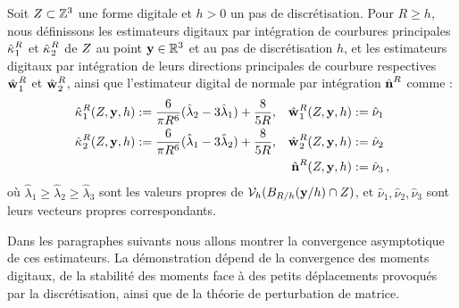 \begin{definition}
  \label{def:principal-curv-estimators}
%
  Soit $Z \subset \mathbb{Z}^3$ une forme digitale et $h > 0$ un pas de
  discrétisation. Pour $R \ge h$, nous définissons les estimateurs digitaux par
  intégration de courbures principales $\hat{\kappa_{}}_{1}^{R}$ et
  $\hat{\kappa_{}}_{2}^{R}$ de $Z$ au point $\mathbf{y} \in \mathbb{R}^3$ et au pas de
  discrétisation $h$, et les estimateurs digitaux par intégration de leurs
  directions principales de courbure respectives $\hat{\mathbf{w}_{}}_{1}^{R}$ et
  $\hat{\mathbf{w}_{}}_{2}^{R}$, ainsi que l'estimateur digital de normale par intégration
  $\hat{\mathbf{n}{}}^{R}$ comme :
%
\begin{align}
  \hat{\kappa_{}}_{1}^{R}(Z,\mathbf{y},h)  &:= \frac{6}{\pi R^6}(\hat{\lambda}_2 - 3\hat{\lambda}_1) + \frac{8}{5R},
  &\hat{\mathbf{w}_{}}_{1}^{R}(Z,\mathbf{y},h) &:= \hat{\nu}_1 \\
  \hat{\kappa_{}}_{2}^{R}(Z,\mathbf{y},h) &:= \frac{6}{\pi R^6}(\hat{\lambda}_1 - 3\hat{\lambda}_2) + \frac{8}{5R},
  &\hat{\mathbf{w}_{}}_{2}^{R}(Z,\mathbf{y},h) &:= \hat{\nu}_2\\
  & &\hat{\mathbf{n}{}}^{R}(Z,\mathbf{y},h) &:=\hat{\nu}_3\,,
\end{align}
%
où $\hat{\lambda}_1 \ge \hat{\lambda}_2 \ge \hat{\lambda}_3$ sont les valeurs
propres de $\mathcal{V}_{h}(B_{R/h}(\mathbf{y} / h) \cap Z)$, et $\hat{\nu}_1,
\hat{\nu}_2, \hat{\nu}_3$ sont leurs vecteurs propres correspondants.
%
\end{definition}
%
Dans les paragraphes suivants nous allons montrer la convergence asymptotique de
ces estimateurs. La démonstration dépend de la convergence des moments digitaux,
de la stabilité des moments face à des petits déplacements provoqués par la
discrétisation, ainsi que de la théorie de perturbation de matrice.
%

